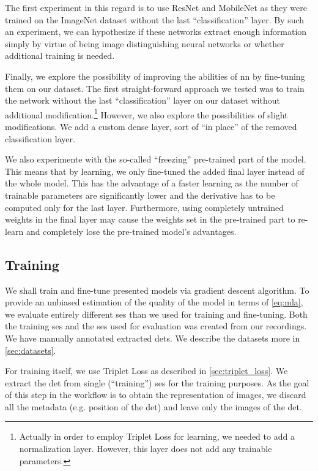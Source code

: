 The first experiment in this regard is to use ResNet and MobileNet as they were trained on the ImageNet dataset without the last ``classification'' layer. By such an experiment, we can hypothesize if these networks extract enough information simply by virtue of being image distinguishing neural networks or whether additional training is needed.

Finally, we explore the possibility of improving the abilities of \gls{nn} by fine-tuning them on our dataset. The first straight-forward approach we tested was to train the network without the last ``classification'' layer on our dataset without additional modification.\footnote{Actually in order to employ Triplet Loss for learning, we needed to add a normalization layer. However, this layer does not add any trainable parameters.} However, we also explore the possibilities of slight modifications. We add a custom dense layer, sort of ``in place'' of the removed classification layer.

We also experimente with the so-called ``freezing'' pre-trained part of the model. This means that by learning, we only fine-tuned the added final layer instead of the whole model. This has the advantage of a faster learning as the number of trainable parameters are significantly lower and the derivative has to be computed only for the last layer. Furthermore, using completely untrained weights in the final layer may cause the weights set in the pre-trained part to re-learn and completely lose the pre-trained model's advantages.

\subsection{Training}

We shall train and fine-tune presented models via gradient descent algorithm. To provide an unbiased estimation of the quality of the model in terms of \autoref{eq:mla}, we evaluate entirely different \gls{ses} than we used for training and fine-tuning. Both the training \gls{ses} and the \gls{ses} used for evaluation was created from our recordings. We have manually annotated extracted \glspl{det}. We describe the datasets more in \autoref{sec:datasets}.

For training itself, we use Triplet Loss as described in \autoref{sec:triplet_loss}. We extract the \gls{det} from single (``training'') \gls{ses} for the training purposes. As the goal of this step in the workflow is to obtain the representation of images, we discard all the metadata (e.g. position of the \gls{det}) and leave only the images of the \gls{det}.


